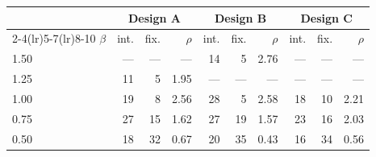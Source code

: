 \begin{tabular}{@{}l r r r r r r r r r@{}}
\toprule
& \multicolumn{3}{c}{Design A} & \multicolumn{3}{c}{Design B} & \multicolumn{3}{c}{Design C} \\
\cmidrule(lr){2-4}\cmidrule(lr){5-7}\cmidrule(lr){8-10}
$\beta$ & int. & fix. & $\rho$ & int. & fix. & $\rho$ & int. & fix. & $\rho$ \\
\midrule
1.50 & --- & --- & --- & 14 & 5 & 2.76 & --- & --- & --- \\
1.25 & 11 & 5 & 1.95 & --- & --- & --- & --- & --- & --- \\
1.00 & 19 & 8 & 2.56 & 28 & 5 & 2.58 & 18 & 10 & 2.21 \\
0.75 & 27 & 15 & 1.62 & 27 & 19 & 1.57 & 23 & 16 & 2.03 \\
0.50 & 18 & 32 & 0.67 & 20 & 35 & 0.43 & 16 & 34 & 0.56 \\
\bottomrule
\end{tabular}
